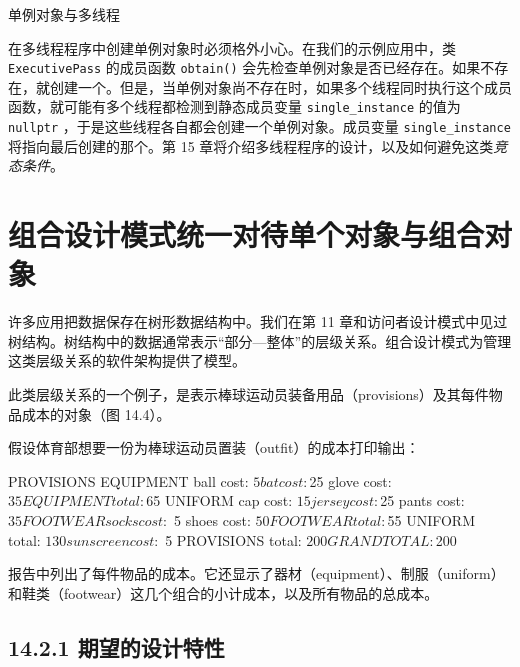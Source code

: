 \begin{mySidebar}{单例对象与多线程}

在多线程程序中创建单例对象时必须格外小心。在我们的示例应用中，类 \texttt{Executive\allowbreak{}Pass} 的成员函数 \texttt{obtain()} 会先检查单例对象是否已经存在。如果不存在，就创建一个。但是，当单例对象尚不存在时，如果多个线程同时执行这个成员函数，就可能有多个线程都检测到静态成员变量 \texttt{single\_\allowbreak{}instance} 的值为 \texttt{nullptr} ，于是这些线程各自都会创建一个单例对象。成员变量 \texttt{single\_\allowbreak{}instance} 将指向最后创建的那个。第 15 章将介绍多线程程序的设计，以及如何避免这类\emph{竞态条件}。
\end{mySidebar}

\section{组合设计模式统一对待单个对象与组合对象}

许多应用把数据保存在树形数据结构中。我们在第 11 章和访问者设计模式中见过树结构。树结构中的数据通常表示“部分—整体”的层级关系。组合设计模式为管理这类层级关系的软件架构提供了模型。

此类层级关系的一个例子，是表示棒球运动员装备用品（provisions）及其每件物品成本的对象（图 14.4）。


假设体育部想要一份为棒球运动员置装（outfit）的成本打印输出：

\begin{codebox}
PROVISIONS
    EQUIPMENT
          ball cost: $ 5
           bat cost: $25
         glove cost: $35
    EQUIPMENT total: $65
    UNIFORM
           cap cost: $15
        jersey cost: $25
         pants cost: $35
        FOOTWEAR
             socks cost: $ 5
             shoes cost: $50
        FOOTWEAR total: $55
    UNIFORM total: $130
    sunscreen cost: $ 5
PROVISIONS total: $200

GRAND TOTAL: $200
\end{codebox}

报告中列出了每件物品的成本。它还显示了器材（equipment）、制服（uniform）和鞋类（footwear）这几个组合的小计成本，以及所有物品的总成本。

\subsection{14.2.1 期望的设计特性}

